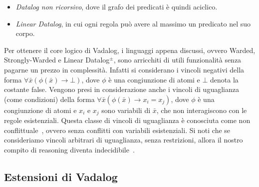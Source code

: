 \begin{itemize}
	\item \emph{Datalog non ricorsivo}, dove il grafo dei predicati è quindi aciclico.
	\item \emph{Linear Datalog}, in cui ogni regola può avere al massimo un predicato nel suo corpo.
\end{itemize}
Per ottenere il core logico di Vadalog, i linguaggi appena discussi, ovvero Warded, Strongly-Warded e Linear Datalog$^\pm$, sono arricchiti di utili funzionalità senza pagarne un prezzo in complessità. \newline
Infatti si considerano i vincoli negativi della forma $\forall \bar{x}(\phi(\bar{x}) \rightarrow \bot)$, dove $\phi$ è una congiunzione di atomi e $\bot$ denota la costante false. Vengono presi in considerazione anche i vincoli di uguaglianza (come condizioni) della forma $\forall \bar{x}(\phi(\bar{x}) \rightarrow x_{i} = x_{j})$, dove $\phi$ è una congiunzione di atomi e $x_{i}$ e $x_{j}$ sono variabili di $\bar{x}$, che non interagiscono con le regole esistenziali. Questa classe di vincoli di uguaglianza è conosciuta come non conflittuale~\cite{cali2012towards}, ovvero senza conflitti con variabili esistenziali. \newline
Si noti che se consideriamo vincoli arbitrari di uguaglianza, senza restrizioni, allora il nostro compito di reasoning diventa indecidibile~\cite{chandra1985implication}.

\subsection{Estensioni di Vadalog}

